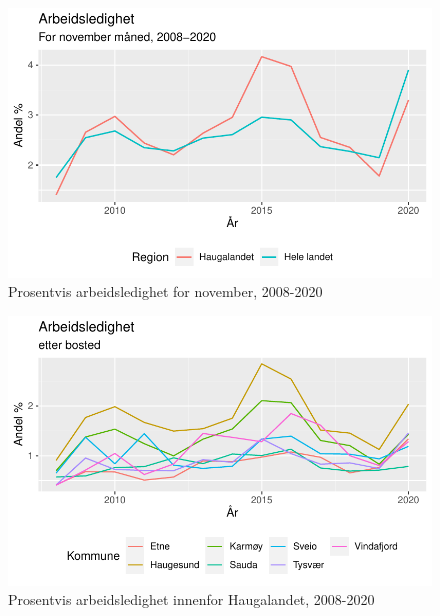 \documentclass[
]{article}
\begin{document}
\begin{figure}[H]

{\centering \includegraphics{Masteroppgave_files/figure-pdf/fig-arbeidsledighet-1.pdf}

}

\caption{\label{fig-arbeidsledighet}Prosentvis arbeidsledighet for
november, 2008-2020}

\end{figure}

\begin{figure}[H]

{\centering \includegraphics{Masteroppgave_files/figure-pdf/fig-arbeidsledighet-internt-1.pdf}

}

\caption{\label{fig-arbeidsledighet-internt}Prosentvis arbeidsledighet
innenfor Haugalandet, 2008-2020}

\end{figure}
\end{document}
